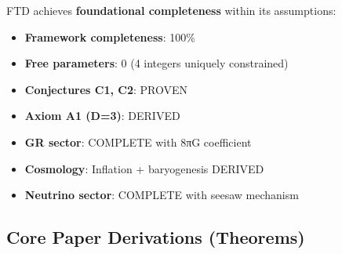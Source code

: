 \documentclass[
  11pt,
  letterpaper,
  twoside,
  openright]{book}
\providecommand{\tightlist}{%
  \setlength{\itemsep}{0pt}\setlength{\parskip}{0pt}}
\begin{document}
\begin{tcolorbox}[enhanced jigsaw, coltitle=black, colbacktitle=quarto-callout-important-color!10!white, toprule=.15mm, colframe=quarto-callout-important-color-frame, arc=.35mm, opacityback=0, bottomtitle=1mm, toptitle=1mm, breakable, colback=white, titlerule=0mm, opacitybacktitle=0.6, title=\textcolor{quarto-callout-important-color}{\faExclamation}\hspace{0.5em}{Foundational Completeness Status}, rightrule=.15mm, bottomrule=.15mm, leftrule=.75mm, left=2mm]

FTD achieves \textbf{foundational completeness} within its assumptions:

\begin{itemize}
\tightlist
\item
  \textbf{Framework completeness}: 100\%
\item
  \textbf{Free parameters}: 0 (4 integers uniquely constrained)
\item
  \textbf{Conjectures C1, C2}: PROVEN
\item
  \textbf{Axiom A1 (D=3)}: DERIVED
\item
  \textbf{GR sector}: COMPLETE with 8πG coefficient
\item
  \textbf{Cosmology}: Inflation + baryogenesis DERIVED
\item
  \textbf{Neutrino sector}: COMPLETE with seesaw mechanism
\end{itemize}

\end{tcolorbox}

\subsection{Core Paper Derivations
(Theorems)}\label{core-paper-derivations-theorems}
\end{document}
